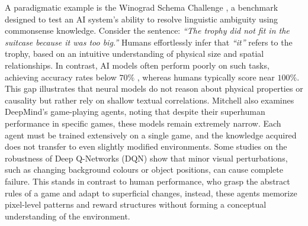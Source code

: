 \documentclass[12pt,a4paper]{report}
\begin{document}
A paradigmatic example is the Winograd Schema Challenge \cite{chiave35}, a benchmark designed to test an AI system's ability to resolve linguistic ambiguity using commonsense knowledge. Consider the sentence: \textit{“The trophy did not fit in the suitcase because it was too big.”} Humans effortlessly infer that \textit{“it”} refers to the trophy, based on an intuitive understanding of physical size and spatial relationships. In contrast, AI models often perform poorly on such tasks, achieving accuracy rates below $70\%$ , whereas humans typically score near $100\%$. This gap illustrates that neural models do not reason about physical properties or causality but rather rely on shallow textual correlations.
Mitchell also examines DeepMind's game-playing agents, noting that despite their superhuman performance in specific games, these models remain extremely narrow. Each agent must be trained extensively on a single game, and the knowledge acquired does not transfer to even slightly modified environments. Some studies on the robustness of Deep Q-Networks (DQN) \cite{chiave55} show that minor visual perturbations, such as changing background colours or object positions, can cause complete failure. This stands in contrast to human performance, who grasp the abstract rules of a game and adapt to superficial changes, instead, these agents memorize pixel-level patterns and reward structures without forming a conceptual understanding of the environment.
\end{document}
